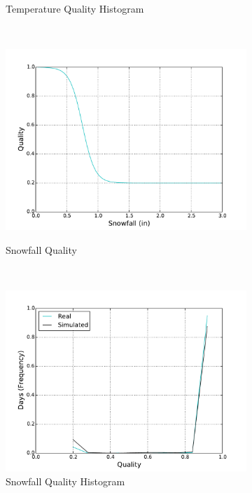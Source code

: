 \documentclass[11pt, letterpaper]{article}
\begin{document}
\begin{figure}[H]
\begin{subfigure}[b]{0.45\textwidth}
    \caption{Temperature Quality Histogram}
  \end{subfigure}
  ~
  \begin{subfigure}[b]{0.45\textwidth}
    \includegraphics[width=\textwidth]{figures/weather_quality.pdf}
    \label{fig:analysis-raw}
    \caption{Snowfall Quality}
  \end{subfigure}
  ~
  \begin{subfigure}[b]{0.45\textwidth}
    \includegraphics[width=\textwidth]{figures/daily_snowfall_quality_hist.pdf}
    \caption{Snowfall Quality Histogram}
  \end{subfigure}
  \label{fig:analysis}
  \caption{}
\end{figure}
\end{document}

